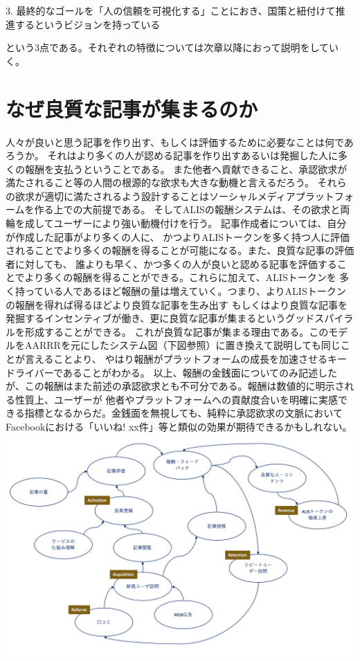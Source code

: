 \documentclass{jsarticle}
\begin{document}
3. 最終的なゴールを「人の信頼を可視化する」ことにおき、国策と紐付けて推進するというビジョンを持っている

という3点である。それぞれの特徴については次章以降におって説明をしていく。
\section{なぜ良質な記事が集まるのか}
人々が良いと思う記事を作り出す、もしくは評価するために必要なことは何であろうか。  
それはより多くの人が認める記事を作り出すあるいは発掘した人に多くの報酬を支払うということである。
また他者へ貢献できること、承認欲求が満たされること等の人間の根源的な欲求も大きな動機と言えるだろう。
それらの欲求が適切に満たされるよう設計することはソーシャルメディアプラットフォームを作る上での大前提である。
そしてALISの報酬システムは、その欲求と両輪を成してユーザーにより強い動機付けを行う。
記事作成者については、自分が作成した記事がより多くの人に、
かつよりALISトークンを多く持つ人に評価されることでより多くの報酬を得ることが可能になる。また、良質な記事の評価者に対しても、
誰よりも早く、かつ多くの人が良いと認める記事を評価することでより多くの報酬を得ることができる。これらに加えて、ALISトークンを
多く持っている人であるほど報酬の量は増えていく。つまり、よりALISトークンの報酬を得れば得るほどより良質な記事を生み出す
もしくはより良質な記事を発掘するインセンティブが働き、更に良質な記事が集まるというグッドスパイラルを形成することができる。
これが良質な記事が集まる理由である。このモデルをAARRRを元にしたシステム図（下図参照）に置き換えて説明しても同じことが言えることより、
やはり報酬がプラットフォームの成長を加速させるキードライバーであることがわかる。
以上、報酬の金銭面についてのみ記述したが、この報酬はまた前述の承認欲求とも不可分である。報酬は数値的に明示される性質上、ユーザーが
他者やプラットフォームへの貢献度合いを明確に実感できる指標となるからだ。金銭面を無視しても、純粋に承認欲求の文脈において
Facebookにおける「いいね! xx件」等と類似の効果が期待できるかもしれない。
	\includegraphics[scale=0.6]{img/systemthinking-with-AARRR.png}
\end{document}
